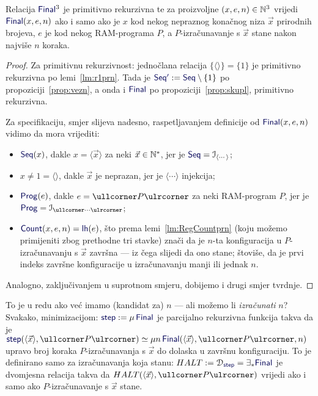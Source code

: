 \begin{lema}[{name=[primitivna rekurzivnost završnosti konfiguracije]}]\label{lm:Finalspec}
Relacija $\f{Final}^3$ je primitivno rekurzivna te
za proizvoljne $(x,e,n)\in{\mathbb N}^3$ vrijedi $\f{Final}(x,e,n)$ ako i samo ako je $x$ kod nekog nepraznog konačnog niza $\vec x$ prirodnih brojeva, $e$ je kod nekog RAM-programa $P$, a $P$-izračunavanje s $\vec x$ stane nakon najviše $n$ koraka.
\end{lema}
\begin{proof}
    Za primitivnu rekurzivnost: jednočlana relacija $\{\langle\rangle\}=\{1\}$ je primitivno rekurzivna po lemi~\ref{lm:r1prn}. Tada je $\f{Seq'}:=\f{Seq}\setminus\{1\}$ po propoziciji~\ref{prop:vezn}, a onda i $\f{Final}$ po propoziciji~\ref{prop:skupl}, primitivno rekurzivna.

Za specifikaciju, smjer slijeva nadesno, raspetljavanjem definicije od $\f{Final}(x,e,n)$ vidimo da mora vrijediti:
\begin{itemize}
    \item $\f{Seq}(x)$, dakle $x=\langle\vec x\rangle$ za neki $\vec x\in{\mathbb N}^*$, jer je $\f{Seq}=\im{\langle\cdots\rangle}$;
    \item $x\ne1=\langle\rangle$, dakle $\vec x$ je neprazan, jer je $\langle\cdots\rangle$ injekcija;
    \item $\f{Prog}(e)$, dakle $e=\kprog{P}$ za neki RAM-program $P$, jer je $\f{Prog}=\im{\kprog{\cdots}}$;
    \item $\f{Count}(x,e,n)\eq\f{lh}(e)$, što prema lemi~\ref{lm:RegCountprn} (koju možemo primijeniti zbog prethodne tri stavke) znači da je $n$-ta konfiguracija u $P$-izračunavanju s $\vec x$ završna --- iz čega slijedi da ono stane; štoviše, da je prvi indeks završne konfiguracije u izračunavanju manji ili jednak $n$.
\end{itemize}
Analogno, zaključivanjem u suprotnom smjeru, dobijemo i drugi smjer tvrdnje.
\end{proof}

To je u redu ako već imamo (kandidat za) $n$ --- ali možemo li \emph{izračunati} $n$? Svakako, minimizacijom: $\f{step}:=\mu\,\f{Final}$ je parcijalno rekurzivna funkcija takva da je $\f{step}(\langle\vec x\rangle,\kprog P)\simeq\mu n\,\f{Final}(\langle\vec x\rangle,\kprog{P},n)$ upravo broj koraka $P$-izračunavanja s $\vec x$ do dolaska u završnu konfiguraciju. To je definirano samo za izračunavanja koja stanu: $HALT:=\dom{\f{step}}=\exists_*\f{Final}$ je dvomjesna relacija takva da $HALT(\langle \vec x\rangle,\kprog P)$ vrijedi ako i samo ako $P$-izračunavanje s $\vec x$ stane.

